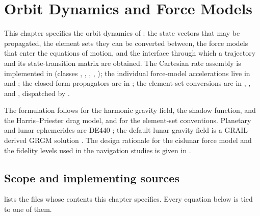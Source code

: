 \chapter{Orbit Dynamics and Force Models}
\label{chap:dynamics}

This chapter specifies the orbit dynamics of \lupnt{}: the state vectors that may
be propagated, the element sets they can be converted between, the force models
that enter the equations of motion, and the interface through which a trajectory
and its state-transition matrix are obtained. The Cartesian rate assembly is
implemented in  (classes
, , ,
, ); the individual force-model
accelerations live in  and
; the closed-form propagators are in
; the element-set
conversions are in ,
, and
, dispatched by
.

The formulation follows \citet{montenbruck2000} for the harmonic gravity field,
the shadow function, and the Harris--Priester drag model, and
\citet{vallado2013} for the element-set conventions. Planetary and lunar
ephemerides are DE440 \citep{park2021de440}; the default lunar gravity field is a
GRAIL-derived GRGM solution \citep{lemoine2013grgm}. The design rationale for the
cislunar force model and the fidelity levels used in the navigation studies is
given in \citep[Ch.~2]{iiyama2026thesis}.

\section{Scope and implementing sources}
\label{sec:dyn-sources}

 lists the files whose contents this chapter specifies.
Every equation below is tied to one of them.

